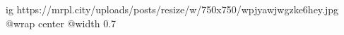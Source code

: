  
 
 
 
 

\ifcmt
  ig https://mrpl.city/uploads/posts/resize/w/750x750/wpjyawjwgzke6hey.jpg
  @wrap center
  @width 0.7
\fi
